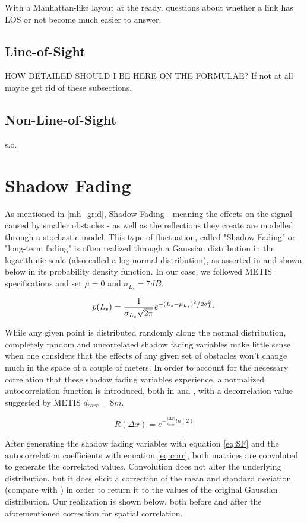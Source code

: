With a Manhattan-like layout at the ready, questions about whether a link has LOS or not become much easier to answer.

\subsection{Line-of-Sight}
HOW DETAILED SHOULD I BE HERE ON THE FORMULAE?
If not at all maybe get rid of these subsections.

\subsection{Non-Line-of-Sight}
s.o.

\section{Shadow Fading} \label{SF}
As mentioned in \ref{mh_grid}, Shadow Fading - meaning the effects on the signal caused by smaller obstacles - as well as the reflections they create are modelled through a stochastic model. This type of fluctuation, called "Shadow Fading" or "long-term fading" is often realized through a Gaussian distribution in the logarithmic scale (also called a log-normal distribution), as asserted in \cite{Forkel2004} and shown below in its probability density function. In our case, we followed METIS specifications and set $\mu = 0$ and $\sigma_{L_s} = 7 dB$.

\begin{equation} \label{eq:SF}
p(L_s) = \frac{1}{{\sigma_{L_s} \sqrt {2\pi } }}e^{{{ - \left( {L_s - \mu_{L_s} } \right)^2 } \mathord{\left/ {\vphantom {{ - \left( {x - \mu } \right)^2 } {2\sigma_{L_s} ^2 }}} \right. \kern-\nulldelimiterspace} {2\sigma_{L_s} ^2 }}}
\end{equation}

While any given point is distributed randomly along the normal distribution, completely random and uncorrelated shadow fading variables make little sense when one considers that the effects of any given set of obstacles won't change much in the space of a couple of meters. In order to account for the necessary correlation that these shadow fading variables experience, a normalized autocorrelation function is introduced, both in \cite{Forkel2004} and \cite{Raschkowski}, with a decorrelation value suggested by METIS $d_{corr} = 8 m$.

\begin{equation} \label{eq:corr}
R(\Delta x) = e^{-\frac{|\Delta x|}{d_{corr}} ln(2)}
\end{equation}

After generating the shadow fading variables with equation \ref{eq:SF} and the autocorrelation coefficients with equation \ref{eq:corr}, both matrices are convoluted to generate the correlated values. Convolution does not alter the underlying distribution, but it does elicit a correction of the mean and standard deviation (compare with \cite{Forkel2004}) in order to return it to the values of the original Gaussian distribution. Our realization is shown below, both before and after the aforementioned correction for spatial correlation.